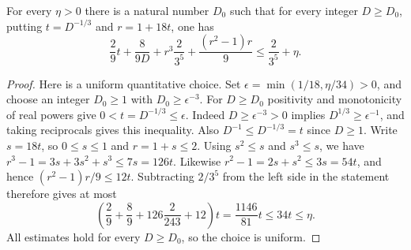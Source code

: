 \begin{lemma}
For every $\eta>0$ there is a natural number $D_0$ such that for every
integer $D\ge D_0$, putting $t=D^{-1/3}$ and $r=1+18t$, one has
\[
\frac29t+\frac8{9D}+r^3\frac2{3^5}
 +\frac{(r^2-1)r}{9}\le\frac2{3^5}+\eta.
\]
\end{lemma}
\begin{proof}
Here is a uniform quantitative choice. Set
$\epsilon=\min(1/18,\eta/34)>0$, and choose an integer $D_0\ge1$
with $D_0\ge\epsilon^{-3}$. For $D\ge D_0$ positivity and monotonicity
of real powers give $0<t=D^{-1/3}\le\epsilon$. Indeed
$D\ge\epsilon^{-3}>0$ implies $D^{1/3}\ge\epsilon^{-1}$, and taking
reciprocals gives this inequality. Also $D^{-1}\le D^{-1/3}=t$ since
$D\ge1$.
Write $s=18t$, so $0\le s\le1$ and $r=1+s\le2$.
Using $s^2\le s$ and $s^3\le s$, we have
$r^3-1=3s+3s^2+s^3\le7s=126t$.
Likewise $r^2-1=2s+s^2\le3s=54t$, and hence
$(r^2-1)r/9\le12t$.
Subtracting $2/3^5$ from the left side in the statement therefore gives
at most
\[
\left(\frac29+\frac89+126\frac2{243}+12\right)t
=\frac{1146}{81}t\le34t\le\eta.
\]
All estimates hold for every $D\ge D_0$, so the choice is uniform.
\end{proof}
